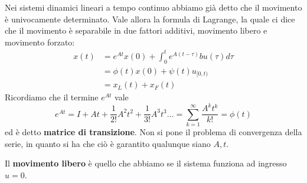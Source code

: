 Nei sistemi dinamici lineari a tempo continuo abbiamo già detto che il movimento è univocamente determinato. Vale allora la formula di Lagrange, la quale ci dice che il movimento è separabile in due fattori additivi, movimento libero e movimento forzato:
\begin{equation}
	\boxed{
		\begin{aligned}
			{\displaystyle x(t)} & {\displaystyle =e^{At} x(0) +\int ^t_0 e^{A(t-\tau)} bu(\tau) d\tau } \\
			                     & =\phi (t) x(0) +\psi (t) u_{[ 0,t)}                                              \\
			                     & =x_L(t) +x_F(t)                                                                  
		\end{aligned}
	}
\end{equation}
Ricordiamo che il termine ${\displaystyle e^{At}}$ vale
\begin{equation*}
	{\displaystyle e^{At} =I+At+\frac{1}{2!} A^2 t^2 +\frac{1}{3!} A^3 t^3 \dotsc =\sum\limits ^{\infty }_{k=1}\frac{A^k t^k}{k!} =\phi (t)}
\end{equation*}
ed è detto \textbf{matrice di transizione}. Non si pone il problema di convergenza della serie, in quanto si ha che ciò è garantito qualunque siano $A,t$.

Il \textbf{movimento libero} è quello che abbiamo se il sistema funziona ad ingresso $u=0$.

